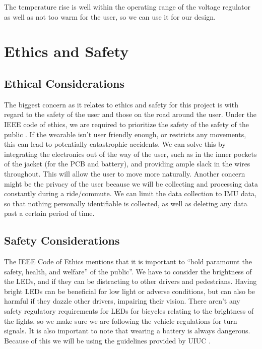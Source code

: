 \documentclass[12pt]{article}
\begin{document}
\noindent The temperature rise is well within the operating range of the voltage regulator as well as not too warm for the user, so we can use it for our design.

\section{Ethics and Safety}
\subsection{Ethical Considerations}
The biggest concern as it relates to ethics and safety for 
this project is with regard to the safety of the user and 
those on the road around the user. Under the IEEE code of 
ethics, we are required to prioritize the safety of the 
safety of the public \cite{IEEEethics2024}. If the wearable isn’t user
friendly enough, or restricts any movements, this can lead 
to potentially catastrophic accidents. We can solve this by 
integrating the electronics out of the way of the user, 
such as in the inner pockets of the jacket (for the PCB 
and battery), and providing ample slack in the wires 
throughout. This will allow the user to move more naturally.
Another concern might be the privacy of the user \cite{IEEEethics2024}
because we will be collecting and processing data constantly 
during a ride/commute. We can limit the data collection to 
IMU data, so that nothing personally identifiable is
collected, as well as deleting any data past a certain 
period of time. 




\subsection{Safety Considerations}
The IEEE Code of Ethics mentions that it is important
to “hold paramount the safety, health, and welfare” of 
the public”. \cite{IEEEethics2024}
We have to consider the brightness of the LEDs, 
and if they can be distracting to other drivers and 
pedestrians. Having bright LEDs can be beneficial for 
low light or adverse conditions, but can also be harmful 
if they dazzle other drivers, impairing their vision. 
There aren’t any safety regulatory requirements for 
LEDs for bicycles relating to the brightness of the 
lights, so we make sure we are following the vehicle 
regulations for turn signals. \cite{CFR571_108}  It is also important to note that wearing a battery is always dangerous. Because of this we will be using the guidelines provided by UIUC \cite{UIUCBatterySafety2023}.


\newpage

\end{document}
